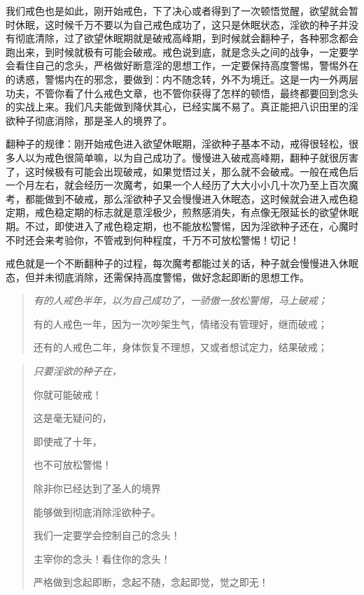 我们戒色也是如此，刚开始戒色，下了决心或者得到了一次顿悟觉醒，欲望就会暂时休眠，这时候千万不要以为自己戒色成功了，这只是休眠状态，淫欲的种子并没有彻底清除，过了欲望休眠期就是破戒高峰期，到时候就会翻种子，各种邪念都会跑出来，到时候就极有可能会破戒。戒色说到底，就是念头之间的战争，一定要学会看住自己的念头，严格做好断意淫的思想工作，一定要保持高度警惕，警惕外在的诱惑，警惕内在的邪念，要做到：内不随念转，外不为境迁。这是一内一外两层功夫，不管你看了什么戒色文章，也不管你获得了怎样的顿悟，最终都要回到念头的实战上来。我们凡夫能做到降伏其心，已经实属不易了。真正能把八识田里的淫欲种子彻底消除，那是圣人的境界了。

翻种子的规律：刚开始戒色进入欲望休眠期，淫欲种子基本不动，戒得很轻松，很多人以为戒色很简单嘛，以为自己成功了。慢慢进入破戒高峰期，翻种子就很厉害了，这时候极有可能会出现破戒，如果觉悟过关，那么就不会破戒。一般在戒色后一个月左右，就会经历一次魔考，如果一个人经历了大大小小几十次乃至上百次魔考，都能做到不破戒，那么淫欲种子又会慢慢进入休眠态，这时候就会进入戒色稳定期，戒色稳定期的标志就是意淫极少，煎熬感消失，有点像无限延长的欲望休眠期。不过，即使进入了戒色稳定期，也不能放松警惕，因为淫欲种子还在，心魔时不时还会来考验你，不管戒到何种程度，千万不可放松警惕！切记！

戒色就是一个不断翻种子的过程，每次魔考都能过关的话，种子就会慢慢进入休眠态，但并未彻底消除，还需保持高度警惕，做好念起即断的思想工作。

\begin{quotation}\it
    有的人戒色半年，以为自己成功了，一骄傲一放松警惕，马上破戒；

    有的人戒色一年，因为一次吵架生气，情绪没有管理好，继而破戒；

    还有的人戒色二年，身体恢复不理想，又或者想试定力，结果破戒；
\end{quotation}

\begin{quotation}\it
    只要淫欲的种子在，

    你就可能破戒！

    这是毫无疑问的，

    即使戒了十年，

    也不可放松警惕！

    除非你已经达到了圣人的境界

    能够做到彻底消除淫欲种子。

    我们一定要学会控制自己的念头！

    主宰你的念头！看住你的念头！

    严格做到念起即断，念起不随，念起即觉，觉之即无！
\end{quotation}

